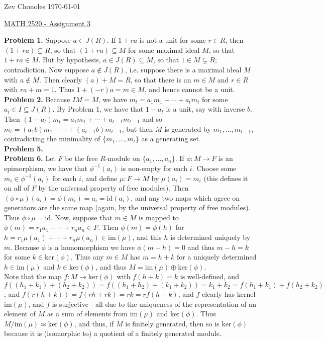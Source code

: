 \documentclass[11pt]{article}
\newcommand{\num}[1]{\noindent \textbf{#1}}
\theoremstyle{definition}
\begin{document}
\noindent Zev Chonoles \hfill \today\\[-0.4in]
\begin{center}
\noindent \underline{MATH 2520 - Assignment 3}
\end{center}

\num{Problem 1.} Suppose $a\in J(R)$. If $1+ra$ is not a unit for some $r\in
R$, then $(1+ra)\subsetneq R$, so that $(1+ra)\subseteq M$ for some maximal
ideal $M$, so that $1+ra\in M$. But by hypothesis, $a\in J(R)\subseteq M$,
so that $1\in M\subsetneq R$; contradiction. Now suppose $a\notin J(R)$,
i.e. suppose there is a maximal ideal $M$ with $a\notin M$. Then clearly
$(a)+M=R$, so that there is an $m\in M$ and $r\in R$ with $ra+m=1$. Thus
$1+(-r)a=m\in M$, and hence cannot be a unit.       \\

\num{Problem 2.} Because $IM=M$, we have $m_t=a_1m_1+\cdots+a_tm_t$ for some
$a_i\in I\subseteq J(R)$. By Problem 1, we have that $1-a_t$ is a unit,
say with inverse $b$. Then $(1-a_t)m_t=a_1m_1+\cdots+a_{t-1}m_{t-1}$ and
so $m_t=(a_1b)m_1+\cdots+(a_{t-1}b)m_{t-1}$, but then $M$ is generated by
$m_1,\ldots,m_{t-1}$, contradicting the minimality of $\{m_1,\ldots,m_t\}$
as a generating set.       \\
\num{Problem 5.}\\

\num{Problem 6.} Let $F$ be the free $R$-module on $\{a_1,\ldots,a_n\}$. If
$\phi:M\rightarrow F$ is an epimorphism, we have that $\phi^{-1}(a_i)$
is non-empty for each $i$. Choose some $m_i\in\phi^{-1}(a_i)$ for each
$i$, and define $\mu:F\rightarrow M$ by $\mu(a_i)=m_i$ (this defines
it on all of $F$ by the universal property of free modules). Then
$(\phi\circ\mu)(a_i)=\phi(m_i)=a_i=\text{id}(a_i)$, and any two maps which
agree on generators are the same map (again, by the universal property of
free modules). Thus $\phi\circ\mu=\text{id}$. Now, suppose that $m\in M$
is mapped to $\phi(m)=r_1a_1+\cdots+r_na_n\in F$. Then $\phi(m)=\phi(h)$
for $h=r_1\mu(a_1)+\cdots+r_n\mu(a_n)\in \text{im}(\mu)$, and this $h$
is determined uniquely by $m$. Because $\phi$ is a homomorphism we have
$\phi(m-h)=0$ and thus $m-h=k$ for some $k\in \text{ker}(\phi)$. Thus any
$m\in M$ has $m=h+k$ for a uniquely determined $h\in\text{im}(\mu)$ and
$k\in\text{ker}(\phi)$, and thus $M=\text{im}(\mu)\oplus\text{ker}(\phi)$.\\

\noindent Note that the map $f:M\rightarrow\text{ker}(\phi)$
with $f(h+k)=k$ is well-defined, and
$f((h_1+k_1)+(h_2+k_2))=f((h_1+h_2)+(k_1+k_2))=k_1+k_2=f(h_1+k_1)+f(h_2+k_2)$,
and  $f(r(h+k))=f(rh+rk)=rk=rf(h+k)$, and $f$ clearly has kernel
$\text{im}(\mu)$, and $f$ is surjective - all due to the uniqueness of the
representation of an element of $M$ as a sum of elements from im$(\mu)$
and ker$(\phi)$. Thus $M/\text{im}(\mu)\simeq \text{ker}(\phi)$, and thus,
if $M$ is finitely generated, then so is $\text{ker}(\phi)$ because it is
(isomorphic to) a quotient of a finitely generated module.\\
\end{document}
